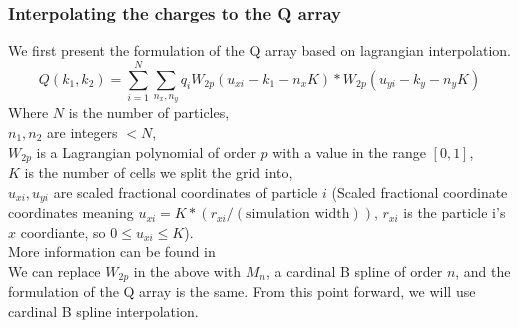 \documentclass[pdftex,twoside,a4paper]{report}
\begin{document}
\subsubsection{Interpolating the charges to the Q array}
\label{sec:math_desc_lagrange}
We first present the formulation of the Q array based on lagrangian interpolation. 
\begin{equation} \label{eq:q_array}
Q(k_1,k_2) = \sum_{i=1} ^N \sum_{n_x,n_y} q_i W_{2p}(u_{xi} - k_1 - n_xK) * W_{2p}(u_{yi} - k_y - n_yK)
\end{equation}
Where $N$ is the number of particles,\\
$n_1,n_2$ are integers $< N$,\\
$W_{2p}$ is a Lagrangian polynomial of order $p$ with a value in the range $[0,1]$,\\
$K$ is the number of cells we split the grid into,\\
$u_{xi}, u_{yi}$ are scaled fractional coordinates of particle $i$ (Scaled fractional coordinate coordinates meaning $u_{xi} = K * (r_{xi} / (\text{simulation width}))$, $r_{xi}$ is the particle i's $x$ coordiante, so $0 \leq u_{xi} \leq K$).\\
More information can be found in \cite{essmann:8577}\\

We can replace $W_{2p}$ in the above with $M_n$, a cardinal B spline of order $n$, and the formulation of the Q array is the same. From this point forward, we will use cardinal B spline interpolation.
\end{document}
